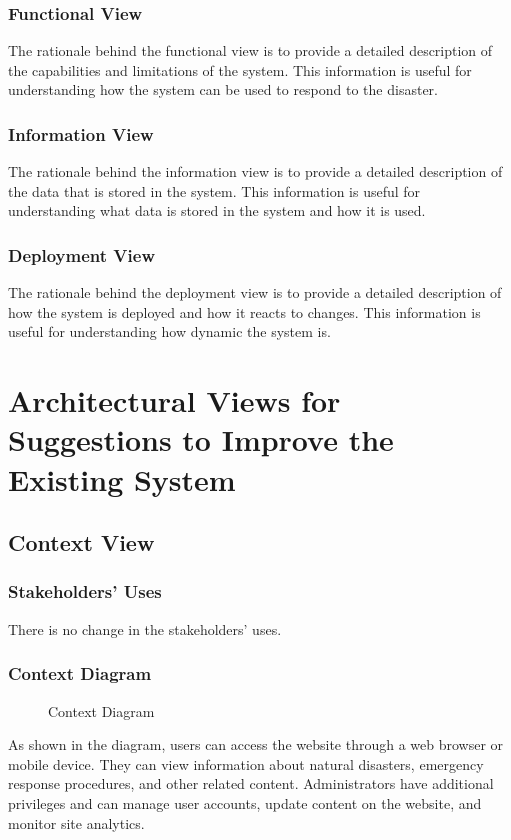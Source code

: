 \documentclass[a4paper]{article}
\begin{document}
    \subsubsection{Functional View}
    The rationale behind the functional view is to provide a detailed description of the capabilities and limitations of the
    system. This information is useful for understanding how the system can be used to respond to the disaster.
    \subsubsection{Information View}
    The rationale behind the information view is to provide a detailed description of the data that is stored in the system.
    This information is useful for understanding what data is stored in the system and how it is used.
    \subsubsection{Deployment View}
    The rationale behind the deployment view is to provide a detailed description of how the system is deployed and how it reacts
    to changes. This information is useful for understanding how dynamic the system is.

    \section{Architectural Views for Suggestions to Improve the Existing System}
    \subsection{Context View}
    \subsubsection{Stakeholders' Uses}
    There is no change in the stakeholders' uses.
    \subsubsection{Context Diagram} %
    \begin{figure}
    
    \caption{Context Diagram}
    \end{figure}
        As shown in the diagram, users can access the website through a web browser or mobile device. They can view information about
        natural disasters, emergency response procedures, and other related content. Administrators have additional privileges and can
        manage user accounts, update content on the website, and monitor site analytics.
\end{document}
